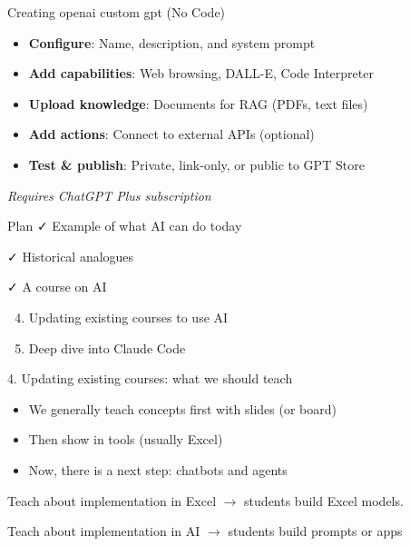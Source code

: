 \documentclass[
  ignorenonframetext,
]{beamer}
\providecommand{\tightlist}{%
  \setlength{\itemsep}{0pt}\setlength{\parskip}{0pt}}
\begin{document}
\begin{frame}{Creating openai custom gpt (No Code)}
\label{creating-openai-custom-gpt-no-code}
\begin{itemize}
\tightlist
\item
  \textbf{Configure}: Name, description, and system prompt
\item
  \textbf{Add capabilities}: Web browsing, DALL-E, Code Interpreter
\item
  \textbf{Upload knowledge}: Documents for RAG (PDFs, text files)
\item
  \textbf{Add actions}: Connect to external APIs (optional)
\item
  \textbf{Test \& publish}: Private, link-only, or public to GPT Store
\end{itemize}

\emph{Requires ChatGPT Plus subscription}
\end{frame}

\begin{frame}{Plan}
\label{plan-2}
✓ Example of what AI can do today

✓ Historical analogues

✓ A course on AI

\begin{enumerate}
\setcounter{enumi}{3}
\item
  Updating existing courses to use AI
\item
  Deep dive into Claude Code
\end{enumerate}
\end{frame}

\begin{frame}{4. Updating existing courses: what we should teach}
\label{updating-existing-courses-what-we-should-teach}
\begin{itemize}
\tightlist
\item
  We generally teach concepts first with slides (or board)
\item
  Then show in tools (usually Excel)
\item
  Now, there is a next step: chatbots and agents
\end{itemize}

Teach about implementation in Excel \(\rightarrow\) students build Excel
models.

Teach about implementation in AI \(\rightarrow\) students build prompts
or apps
\end{frame}
\end{document}
